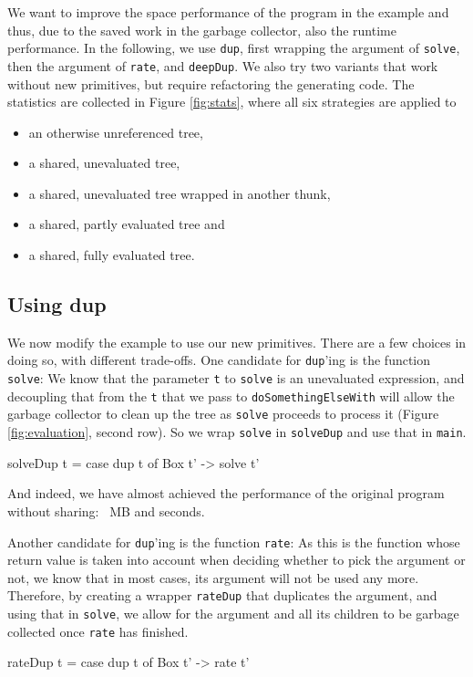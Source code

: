 \documentclass[preprint]{sigplanconf}
\theoremstyle{nonumberplain}
\newcommand{\li}{\lstinline[style=Haskell]}
\begin{document}
We want to improve the space performance of the program in the example and thus, due to the saved work in the garbage collector, also the runtime performance. In the following, we use \li-dup-, first wrapping the argument of \li-solve-, then the argument of \li-rate-, and \li-deepDup-. We also try two variants that work without new primitives, but require refactoring the generating code. The statistics are collected in Figure \ref{fig:stats}, where all six strategies are applied to
\begin{itemize}
\item an otherwise unreferenced tree,
\item a shared, unevaluated tree, 
\item a shared, unevaluated tree wrapped in another thunk,
\item a shared, partly evaluated tree and
\item a shared, fully evaluated tree.
\end{itemize}

\subsection{Using dup}

We now modify the example to use our new primitives. There are a few choices in doing so, with different trade-offs. One candidate for \li-dup-’ing is the function \li-solve-: We know that the parameter \li-t- to \li-solve- is an unevaluated expression, and decoupling that from the \li-t- that we pass to \li-doSomethingElseWith- will allow the garbage collector to clean up the tree as \li-solve- proceeds to process it (Figure \ref{fig:evaluation}, second row). So we wrap \li-solve- in \li-solveDup- and use that in \li-main-.
\begin{haskell}
solveDup t = case dup t of Box t' -> solve t'
\end{haskell}
And indeed, we have almost achieved the performance of the original program without sharing: ~MB and  seconds.


Another candidate for \li-dup-’ing is the function \li-rate-:
As this is the function whose return value is taken into account when deciding whether to pick the argument or not, we know that in most cases, its argument will not be used any more. Therefore, by creating a wrapper \li-rateDup- that duplicates the argument, and using that in \li-solve-, we allow for the argument and all its children to be garbage collected once \li-rate- has finished.
\begin{haskell}
rateDup t = case dup t of Box t' -> rate t'
\end{haskell}
\end{document}

